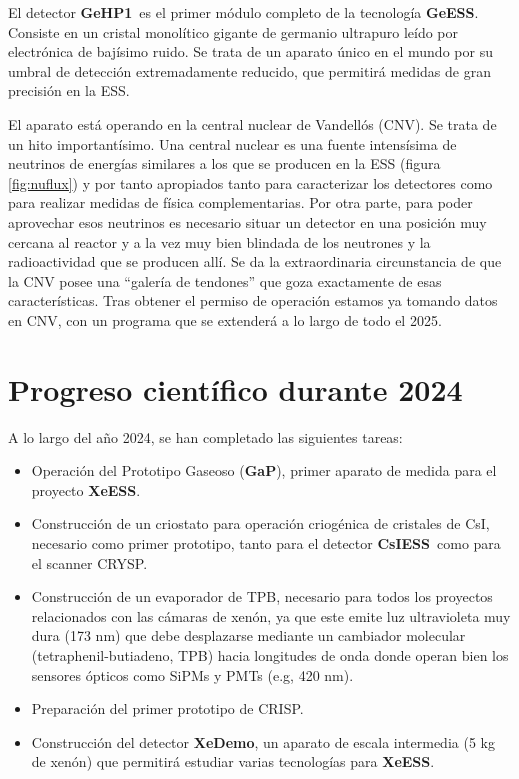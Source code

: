 \documentclass[12pt,a4paper,article]{report} %
\def\xess{{\bf XeESS}}
\def\gess{{\bf GeESS}}
\def\cess{{\bf CsIESS}}
\def\xed{{\bf XeDemo}}
\def\ged{{\bf GeHP1}}
\def\gap{{\bf GaP}}
\begin{document}
El detector \ged\ es el primer módulo completo de la tecnología \gess. Consiste en un cristal monolítico gigante de germanio ultrapuro leído por electrónica de bajísimo ruido. Se trata de un aparato único en el mundo por su umbral de detección extremadamente reducido, que permitirá medidas de gran precisión en la ESS. 


El aparato está operando en la central nuclear de Vandellós (CNV). Se trata de un hito importantísimo. Una central nuclear es una fuente intensísima de neutrinos de energías similares a los que se producen en la ESS (figura \ref{fig:nuflux}) y por tanto apropiados tanto para caracterizar los detectores como para realizar medidas de física complementarias. Por otra parte, para poder aprovechar esos neutrinos es necesario situar un detector en una posición muy cercana al reactor y a la vez muy bien blindada de los neutrones y la radioactividad que se producen allí. Se da la extraordinaria circunstancia de que la CNV posee una ``galería de tendones'' que goza exactamente de esas características.  Tras obtener el permiso de operación estamos ya tomando datos en CNV, con un programa que se extenderá a lo largo de todo el 2025. 


\section*{Progreso científico durante 2024}

A lo largo del año 2024, se han completado las siguientes tareas:
\begin{itemize}
\item Operación del Prototipo Gaseoso (\gap), primer aparato de medida para el proyecto \xess. 
\item Construcción de un criostato para operación criogénica de cristales de CsI, necesario como primer prototipo, tanto para el detector  \cess\ como para el scanner CRYSP. 
\item Construcción de un evaporador de TPB, necesario para todos los proyectos relacionados con las cámaras de xenón, ya que este emite luz ultravioleta muy dura (173 nm) que debe desplazarse mediante un cambiador molecular (tetraphenil-butiadeno, TPB) hacia longitudes de onda donde operan bien los sensores ópticos como SiPMs y PMTs (e.g, 420 nm).  
\item Preparación del primer prototipo de CRISP. 
\item Construcción del detector \xed, un aparato de escala intermedia (5 kg de xenón) que permitirá estudiar varias tecnologías para \xess.  
 
\end{itemize}
\end{document}
